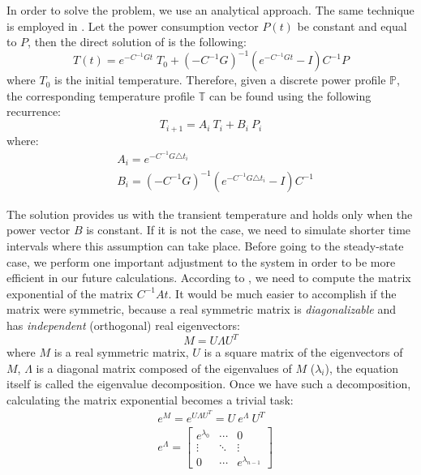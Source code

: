 In order to solve the problem, we use an analytical approach. The same technique is employed in \cite{thiele2011}. Let the power consumption vector $P(t)$ be constant and equal to $P$, then the direct solution of  is the following:
\begin{equation} \label{eq:solution}
  T(t) = e^{-C^{-1}G t} \; T_0 + (-C^{-1} G)^{-1}(e^{-C^{-1}G t} - I)C^{-1} P
\end{equation}
where $T_0$ is the initial temperature. Therefore, given a discrete power profile $\mathbb{P}$, the corresponding temperature profile $\mathbb{T}$ can be found using the following recurrence:
\[
  T_{i+1} = A_i \: T_i + B_i \: P_i
\]
where:
\begin{align*}
  & A_i = e^{-C^{-1} G \triangle t_i} \\
  & B_i = (-C^{-1} G)^{-1}(e^{-C^{-1}G \triangle t_i} - I)C^{-1}
\end{align*}

The solution provides us with the transient temperature and holds only when the power vector $B$ is constant. If it is not the case, we need to simulate shorter time intervals where this assumption can take place. Before going to the steady-state case, we perform one important adjustment to the system in order to be more efficient in our future calculations. According to , we need to compute the matrix exponential of the matrix $C^{-1} A t$. It would be much easier to accomplish if the matrix were symmetric, because a real symmetric matrix is \emph{diagonalizable} and has \emph{independent} (orthogonal) real eigenvectors:
\begin{equation} \label{eq:eigenvalue-decomposition}
  M = U \Lambda U^T
\end{equation}
where $M$ is a real symmetric matrix, $U$ is a square matrix of the eigenvectors of $M$, $\Lambda$ is a diagonal matrix composed of the eigenvalues of $M$ ($\lambda_i$), the equation itself is called the eigenvalue decomposition. Once we have such a decomposition, calculating the matrix exponential becomes a trivial task:
\begin{align}
  & e^M = e^{U \Lambda U^T} = U \: e^{\Lambda} \: U^T \nonumber \\
  & e^{\Lambda} = \left[
      \begin{array}{ccc}
        e^{\lambda_0} & \cdots & 0 \\
        \vdots & \ddots & \vdots \\
        0 & \cdots & e^{\lambda_{n - 1}}
      \end{array}
    \right] \nonumber
\end{align}

